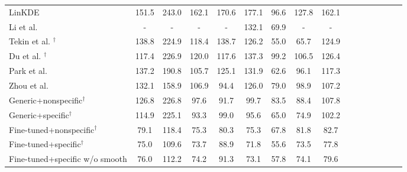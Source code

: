 \begin{table}
\begin{tabular}{l*{15}{c}}
\toprule
LinKDE \cite{ionescu2014human} & 151.5 & 243.0 & 162.1 & 170.6 & 177.1 & 96.6 & 127.8 & 162.1  \\
Li et al. \cite{li2015} & - & - & - & - & 132.1 & 69.9 & - & - \\
Tekin et al. \cite{tekin2015}$^\dagger$ & 138.8 & 224.9 & 118.4 & 138.7 & 126.2 & {55.0 }& {65.7 }& 124.9  \\
Du et al. \cite{du2016marker}$^\dagger$  &        117.4 &       226.9&        120.0 &        117.6 &        137.3 &        99.2 &        106.5 &        126.4 \\
Park et al. \cite{park20163d}  &         137.2 &        190.8 &        105.7 &        125.1 &       131.9 &        62.6 &        96.1 &        117.3 \\
Zhou et al. \cite{zhou2016deep}  &        132.1 &        158.9 &        106.9 &        94.4 &        126.0 &        79.0 &        98.9 &        107.2 \\
Generic+nonspecific$^\dagger$ & 126.8 &        226.8 &         97.6 &         91.7 &         99.7 &         83.5 &         88.4 &        107.8 \\
Generic+specific$^\dagger$ & 114.9 &        225.1 &         93.3 &         99.0 &         95.6 &         65.0 &         74.9 &        102.2 \\
Fine-tuned+nonspecific$^\dagger$ & 79.1 &        118.4 &         75.3 &         80.3 &         75.3 &         67.8 &         81.8 &         82.7 \\
Fine-tuned+specific$^\dagger$ & 75.0 &        109.6 &         73.7 &         88.9 &         71.8 &         55.6 &         73.5 &         77.8 \\
Fine-tuned+specific w/o smooth &         76.0 &        112.2 &         74.2 &         91.3 &         73.1 &         57.8 &         74.1 &         79.6 \\
\toprule
\end{tabular}
\label{tab:h36m}
\end{table}

